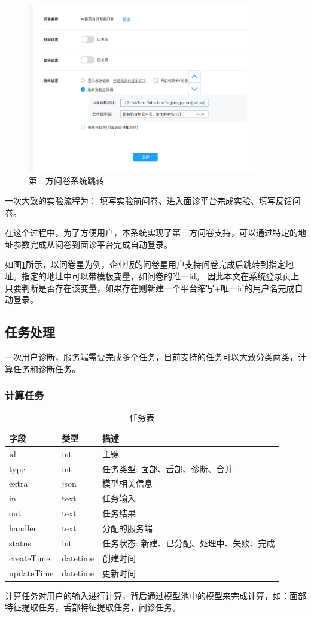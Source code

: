 \begin{figure}[h]
    \centering
    \includegraphics[width=10cm]{images/wjx1.png}
    \caption{第三方问卷系统跳转}
    \label{fig:wjx-ssojump}
\end{figure}

一次大致的实验流程为： 填写实验前问卷、进入面诊平台完成实验、填写反馈问卷。

在这个过程中，为了方便用户，本系统实现了第三方问卷支持，可以通过特定的地址参数完成从问卷到面诊平台完成自动登录。

如图\ref{fig:wjx-ssojump}所示，以问卷星为例，企业版的问卷星用户支持问卷完成后跳转到指定地址。指定的地址中可以带模板变量，如问卷的唯一id。
因此本文在系统登录页上只要判断是否存在该变量，如果存在则新建一个平台缩写+唯一id的用户名完成自动登录。


\subsection{任务处理}
一次用户诊断，服务端需要完成多个任务，目前支持的任务可以大致分类两类，计算任务和诊断任务。


\subsubsection{计算任务}
\begin{table}[]
    \centering
    \caption{任务表}
    \begin{tabular}{lll}
        \toprule
        字段 & 类型 & 描述 \\ 
        \midrule
        id & int & 主键 \\
        type & int & 任务类型: 面部、舌部、诊断、合并 \\ 
        extra & json & 模型相关信息 \\
        in & text & 任务输入 \\
        out & text & 任务结果 \\
        handler & text & 分配的服务端 \\
        status & int & 任务状态: 新建、已分配、处理中、失败、完成 \\
        createTime & datetime & 创建时间 \\
        updateTime & datetime & 更新时间\\
        \bottomrule
    \end{tabular}
    \label{tab:task}
\end{table}
计算任务对用户的输入进行计算，背后通过模型池中的模型来完成计算，如：面部特征提取任务，舌部特征提取任务，问诊任务。

